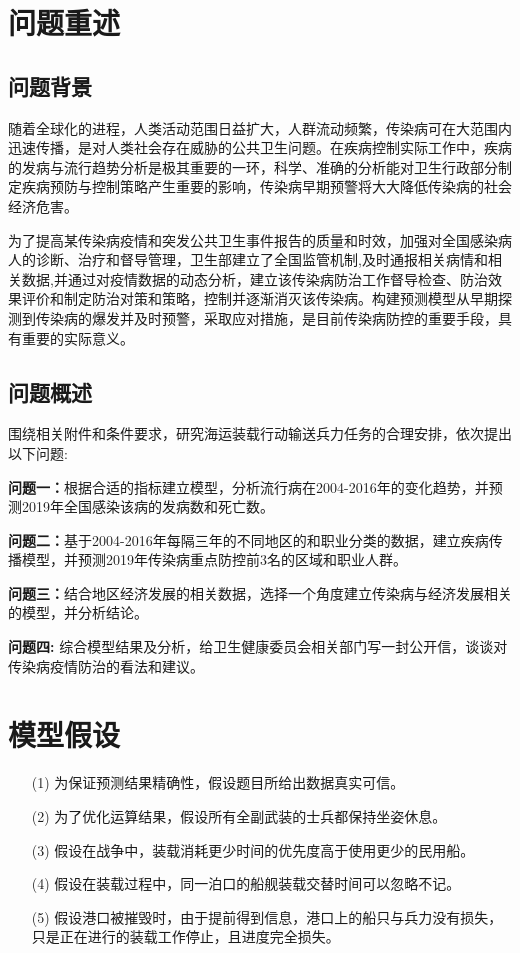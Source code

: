 \documentclass{whutmod}
\begin{document}
	\tableofcontents
	\newpage	%
	
	\section{问题重述}	
	\subsection{问题背景}
    随着全球化的进程，人类活动范围日益扩大，人群流动频繁，传染病可在大范围内迅速传播，是对人类社会存在威胁的公共卫生问题。在疾病控制实际工作中，疾病的发病与流行趋势分析是极其重要的一环，科学、准确的分析能对卫生行政部分制定疾病预防与控制策略产生重要的影响，传染病早期预警将大大降低传染病的社会经济危害。
    
    为了提高某传染病疫情和突发公共卫生事件报告的质量和时效，加强对全国感染病人的诊断、治疗和督导管理，卫生部建立了全国监管机制,及时通报相关病情和相关数据,并通过对疫情数据的动态分析，建立该传染病防治工作督导检查、防治效果评价和制定防治对策和策略，控制并逐渐消灭该传染病。构建预测模型从早期探测到传染病的爆发并及时预警，采取应对措施，是目前传染病防控的重要手段，具有重要的实际意义。
    
    

	\subsection{问题概述}
    围绕相关附件和条件要求，研究海运装载行动输送兵力任务的合理安排，依次提出以下问题:
		 
	
	\textbf{问题一：}根据合适的指标建立模型，分析流行病在2004-2016年的变化趋势，并预测2019年全国感染该病的发病数和死亡数。
	
	\textbf{问题二：}基于2004-2016年每隔三年的不同地区的和职业分类的数据，建立疾病传播模型，并预测2019年传染病重点防控前3名的区域和职业人群。
		
	\textbf{问题三：}结合地区经济发展的相关数据，选择一个角度建立传染病与经济发展相关的模型，并分析结论。
	
	\textbf{问题四: }综合模型结果及分析，给卫生健康委员会相关部门写一封公开信，谈谈对传染病疫情防治的看法和建议。
	
	
	\section{模型假设}
	\begin{itemize}                                             
		\item [(1)] 为保证预测结果精确性，假设题目所给出数据真实可信。
		\item [(2)] 为了优化运算结果，假设所有全副武装的士兵都保持坐姿休息。
		\item [(3)] 假设在战争中，装载消耗更少时间的优先度高于使用更少的民用船。
		\item [(4)] 假设在装载过程中，同一泊口的船舰装载交替时间可以忽略不记。
		\item [(5)] 假设港口被摧毁时，由于提前得到信息，港口上的船只与兵力没有损失，只是正在进行的装载工作停止，且进度完全损失。
	\end{itemize}
	
\end{document}
